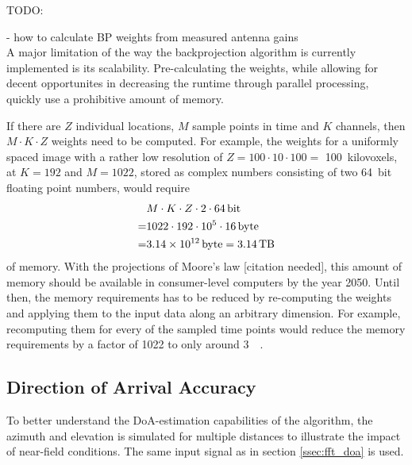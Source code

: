 TODO:

- how to calculate BP weights from measured antenna gains
\\

A major limitation of the way the backprojection algorithm is currently implemented is its scalability.
Pre-calculating the weights, while allowing for decent opportunites in decreasing the runtime through parallel processing,
quickly use a prohibitive amount of memory.

If there are $Z$ individual locations, $M$ sample points in time and $K$ channels, then $M \cdot K \cdot Z$ weights need to be computed.
For example, the weights for a uniformly spaced image with a rather low resolution of  $Z = 100 \cdot 10 \cdot 100 =$ \SI{100}{kilovoxels},
at $K=192$ and $M=1022$, stored as complex numbers consisting of two \SI{64}{bit} floating point numbers, would require
\begin{align*}
      & M \cdot K \cdot Z \cdot 2 \cdot \SI{64}{\bit} \\
    = & 1022 \cdot 192 \cdot 10^5 \cdot \SI{16}{byte} \\
    = & \SI{3.14e12}{byte} = \SI{3.14}{\tera\byte}
\end{align*}
of memory.
With the projections of Moore's law [citation needed],
this amount of memory should be available in consumer-level computers by the year 2050.
Until then, the memory requirements has to be reduced by re-computing the weights
and applying them to the input data along an arbitrary dimension.
For example, recomputing them for every of the sampled time points would reduce
the memory requirements by a factor of 1022 to only around \SI{3}{\giga\byte}.

\subsection{Direction of Arrival Accuracy}

To better understand the DoA-estimation capabilities of the algorithm,
the azimuth and elevation is simulated for multiple distances to illustrate the impact of near-field conditions.
The same input signal as in section \ref{ssec:fft_doa} is used.
\\

